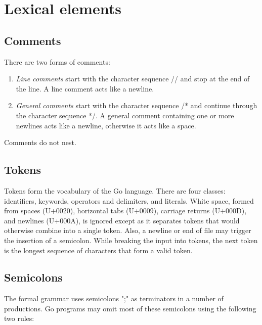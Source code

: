 \documentclass[UTF8]{article}
\begin{document}
\section*{Lexical elements}

\subsection*{Comments}
There are two forms of comments:

\begin{enumerate}
  \item \textit{Line comments} start with the character sequence
  // and stop at the end of the line. A line comment acts like a
  newline.
  
  \item \textit{General comments} start with the character
  sequence /* and continue through the character sequence */. A
  general comment containing one or more newlines acts like a
  newline, otherwise it acts like a space.
\end{enumerate}

Comments do not nest.

\subsection*{Tokens}
Tokens form the vocabulary of the Go language. There are four
classes: identifiers, keywords, operators and delimiters, and
literals. White space, formed from spaces (U+0020), horizontal tabs
(U+0009), carriage returns (U+000D), and newlines (U+000A), is
ignored except as it separates tokens that would otherwise combine
into a single token. Also, a newline or end of file may trigger the
insertion of a semicolon. While breaking the input into tokens, the
next token is the longest sequence of characters that form a valid
token.

\subsection*{Semicolons}
The formal grammar uses semicolons ";" as terminators in a number
of productions. Go programs may omit most of these semicolons using
the following two rules:
\end{document}
